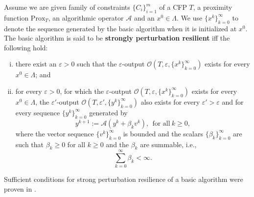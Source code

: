 \documentclass[smallextended]{svjour3}      %
\begin{document}
\begin{definition}
	\label{def: strongly-pert-resilient}Assume we are given family of constraints $\lbrace C_{i}\rbrace_{i=1}^{m}$ of a CFP $T$, a proximity function $\mbox{Prox}_{T}$, an algorithmic operator $\mathcal{A}$ and an $x^{0}\in\Lambda$. We use $\{x^{k}\}_{k=0}^{\infty}$ to denote the sequence generated by the basic algorithm when it is initialized at $x^{0}$. The basic algorithm is said to be \textbf{strongly perturbation resilient} iff the following hold:
	
	\begin{enumerate}[i)]
		\item
			 there exist an $\varepsilon>0$ such that the $\varepsilon$-output
			 $\mathcal{O}\left(T,\varepsilon,\{x^{k}\}_{k=0}^{\infty}\right)$
			 exists for every $x^{0}\in\Lambda$; and
		\item			
			for every $\varepsilon>0$, for which the $\varepsilon$-output
			$\mathcal{O}\left(T,\varepsilon,\{x^{k}\}_{k=0}^{\infty}\right)$
			exists for every $x^{0}\in\Lambda$, the $\varepsilon'$-output $\mathcal{O}\left(T,\varepsilon',\{y^{k}\}_{k=0}^{\infty}\right)$
			also exists for every $\varepsilon'>\varepsilon$ and for every sequence
			$\{y^{k}\}_{k=0}^{\infty}$ generated by
			\begin{equation}
			y^{k+1}:=\mathcal{A}\left(y^{k}+\beta_{k}v^{k}\right),\ \ \mbox{for all}\ k\geq0,
			\end{equation}
			where the vector sequence $\{v^{k}\}_{k=0}^{\infty}$ is bounded and
			the scalars $\{\beta_{k}\}_{k=0}^{\infty}$ are such that $\beta_{k}\geq0$
			for all $k\geq0$ and the $\beta_{k}$ are summable, i.e.,
\begin{equation}
\sum_{k=0}^{\infty}\beta_{k}<\infty.
\end{equation}
 
	\end{enumerate}
\end{definition}
Sufficient conditions for strong perturbation resilience of a basic algorithm were proven in \cite[Theorem 1]{herman2012superiorization}.
\end{document}
